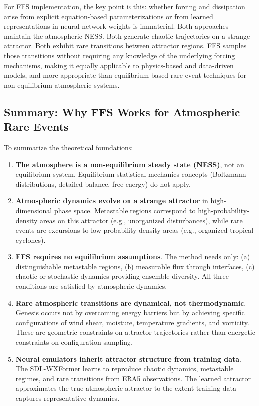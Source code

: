 \documentclass[11pt]{article}
\begin{document}
For FFS implementation, the key point is this: whether forcing and dissipation arise from explicit equation-based parameterizations or from learned representations in neural network weights is immaterial. Both approaches maintain the atmospheric NESS. Both generate chaotic trajectories on a strange attractor. Both exhibit rare transitions between attractor regions. FFS samples those transitions without requiring any knowledge of the underlying forcing mechanisms, making it equally applicable to physics-based and data-driven models, and more appropriate than equilibrium-based rare event techniques for non-equilibrium atmospheric systems.

\subsection{Summary: Why FFS Works for Atmospheric Rare Events}

To summarize the theoretical foundations:

\begin{enumerate}
    \item \textbf{The atmosphere is a non-equilibrium steady state (NESS)}, not an equilibrium system. Equilibrium statistical mechanics concepts (Boltzmann distributions, detailed balance, free energy) do not apply.
    
    \item \textbf{Atmospheric dynamics evolve on a strange attractor} in high-dimensional phase space. Metastable regions correspond to high-probability-density areas on this attractor (e.g., unorganized disturbances), while rare events are excursions to low-probability-density areas (e.g., organized tropical cyclones).
    
    \item \textbf{FFS requires no equilibrium assumptions}. The method needs only: (a) distinguishable metastable regions, (b) measurable flux through interfaces, (c) chaotic or stochastic dynamics providing ensemble diversity. All three conditions are satisfied by atmospheric dynamics.
    
    \item \textbf{Rare atmospheric transitions are dynamical, not thermodynamic}. Genesis occurs not by overcoming energy barriers but by achieving specific configurations of wind shear, moisture, temperature gradients, and vorticity. These are geometric constraints on attractor trajectories rather than energetic constraints on configuration sampling.
    
    \item \textbf{Neural emulators inherit attractor structure from training data}. The SDL-WXFormer learns to reproduce chaotic dynamics, metastable regimes, and rare transitions from ERA5 observations. The learned attractor approximates the true atmospheric attractor to the extent training data captures representative dynamics.
\end{enumerate}
\end{document}
